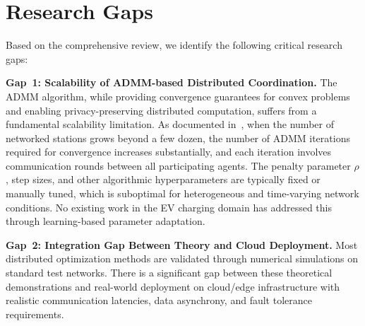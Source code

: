 \documentclass[review]{elsarticle}
\begin{document}
\section{Research Gaps}\label{sec:gaps}

\hspace{0.5cm}Based on the comprehensive review, we identify the following critical research gaps:

\hspace{0.5cm}\textbf{Gap~1: Scalability of ADMM-based Distributed Coordination.}
The ADMM algorithm, while providing convergence guarantees for convex problems and enabling privacy-preserving distributed computation, suffers from a fundamental scalability limitation. As documented in~\cite{zhang2022distributed}, when the number of networked stations grows beyond a few dozen, the number of ADMM iterations required for convergence increases substantially, and each iteration involves communication rounds between all participating agents. The penalty parameter $\rho$, step sizes, and other algorithmic hyperparameters are typically fixed or manually tuned, which is suboptimal for heterogeneous and time-varying network conditions. No existing work in the EV charging domain has addressed this through learning-based parameter adaptation.

\hspace{0.5cm}\textbf{Gap~2: Integration Gap Between Theory and Cloud Deployment.}
Most distributed optimization methods are validated through numerical simulations on standard test networks. There is a significant gap between these theoretical demonstrations and real-world deployment on cloud/edge infrastructure with realistic communication latencies, data asynchrony, and fault tolerance requirements.
\end{document}

